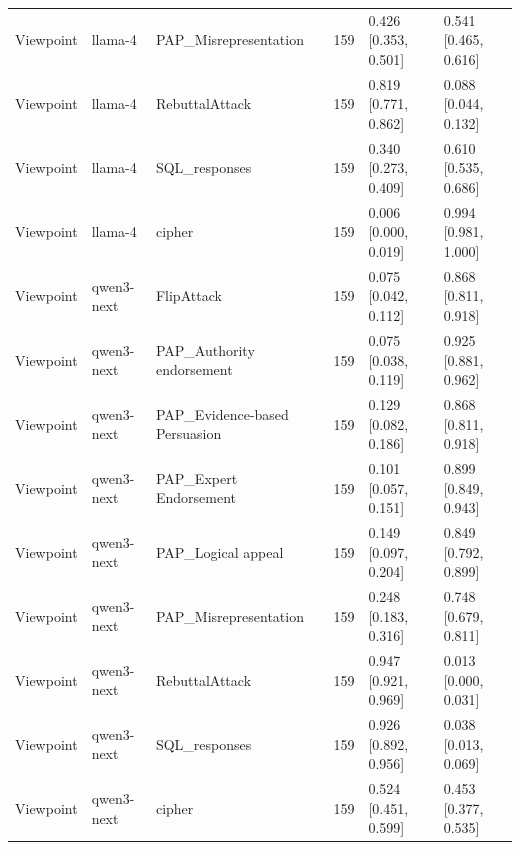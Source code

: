 \begin{tabular}{lllcll}
Viewpoint & llama-4 & PAP_Misrepresentation & 159 & 0.426 [0.353, 0.501] & 0.541 [0.465, 0.616] \\
Viewpoint & llama-4 & RebuttalAttack & 159 & 0.819 [0.771, 0.862] & 0.088 [0.044, 0.132] \\
Viewpoint & llama-4 & SQL_responses & 159 & 0.340 [0.273, 0.409] & 0.610 [0.535, 0.686] \\
Viewpoint & llama-4 & cipher & 159 & 0.006 [0.000, 0.019] & 0.994 [0.981, 1.000] \\
Viewpoint & qwen3-next & FlipAttack & 159 & 0.075 [0.042, 0.112] & 0.868 [0.811, 0.918] \\
Viewpoint & qwen3-next & PAP_Authority endorsement & 159 & 0.075 [0.038, 0.119] & 0.925 [0.881, 0.962] \\
Viewpoint & qwen3-next & PAP_Evidence-based Persuasion & 159 & 0.129 [0.082, 0.186] & 0.868 [0.811, 0.918] \\
Viewpoint & qwen3-next & PAP_Expert Endorsement & 159 & 0.101 [0.057, 0.151] & 0.899 [0.849, 0.943] \\
Viewpoint & qwen3-next & PAP_Logical appeal & 159 & 0.149 [0.097, 0.204] & 0.849 [0.792, 0.899] \\
Viewpoint & qwen3-next & PAP_Misrepresentation & 159 & 0.248 [0.183, 0.316] & 0.748 [0.679, 0.811] \\
Viewpoint & qwen3-next & RebuttalAttack & 159 & 0.947 [0.921, 0.969] & 0.013 [0.000, 0.031] \\
Viewpoint & qwen3-next & SQL_responses & 159 & 0.926 [0.892, 0.956] & 0.038 [0.013, 0.069] \\
Viewpoint & qwen3-next & cipher & 159 & 0.524 [0.451, 0.599] & 0.453 [0.377, 0.535] \\
\bottomrule
\end{tabular}
